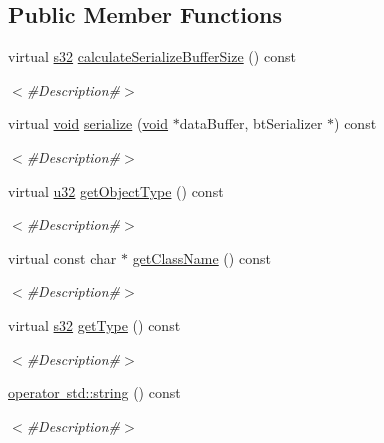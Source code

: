\subsection*{Public Member Functions}
\begin{DoxyCompactItemize}
\item 
virtual \mbox{\hyperlink{_util_8h_aa62c75d314a0d1f37f79c4b73b2292e2}{s32}} \mbox{\hyperlink{classnjli_1_1_material_property_builder_a9a614b1c939742e7cf607609bc203c5e}{calculate\+Serialize\+Buffer\+Size}} () const
\begin{DoxyCompactList}\small\item\em $<$\#\+Description\#$>$ \end{DoxyCompactList}\item 
virtual \mbox{\hyperlink{_thread_8h_af1e856da2e658414cb2456cb6f7ebc66}{void}} \mbox{\hyperlink{classnjli_1_1_material_property_builder_af7e20ef437aa6cc055d94a2d4ca0f917}{serialize}} (\mbox{\hyperlink{_thread_8h_af1e856da2e658414cb2456cb6f7ebc66}{void}} $\ast$data\+Buffer, bt\+Serializer $\ast$) const
\begin{DoxyCompactList}\small\item\em $<$\#\+Description\#$>$ \end{DoxyCompactList}\item 
virtual \mbox{\hyperlink{_util_8h_a10e94b422ef0c20dcdec20d31a1f5049}{u32}} \mbox{\hyperlink{classnjli_1_1_material_property_builder_a1826a34f12138d11c777889a47a20fa6}{get\+Object\+Type}} () const
\begin{DoxyCompactList}\small\item\em $<$\#\+Description\#$>$ \end{DoxyCompactList}\item 
virtual const char $\ast$ \mbox{\hyperlink{classnjli_1_1_material_property_builder_ad525b4ddef84c344f680eae7c3f6d78a}{get\+Class\+Name}} () const
\begin{DoxyCompactList}\small\item\em $<$\#\+Description\#$>$ \end{DoxyCompactList}\item 
virtual \mbox{\hyperlink{_util_8h_aa62c75d314a0d1f37f79c4b73b2292e2}{s32}} \mbox{\hyperlink{classnjli_1_1_material_property_builder_adf85273c4fad09304a9df9f7e8f3be9b}{get\+Type}} () const
\begin{DoxyCompactList}\small\item\em $<$\#\+Description\#$>$ \end{DoxyCompactList}\item 
\mbox{\hyperlink{classnjli_1_1_material_property_builder_a6965c5e122844746df524bb41aa0dc7b}{operator std\+::string}} () const
\begin{DoxyCompactList}\small\item\em $<$\#\+Description\#$>$ \end{DoxyCompactList}\end{DoxyCompactItemize}
